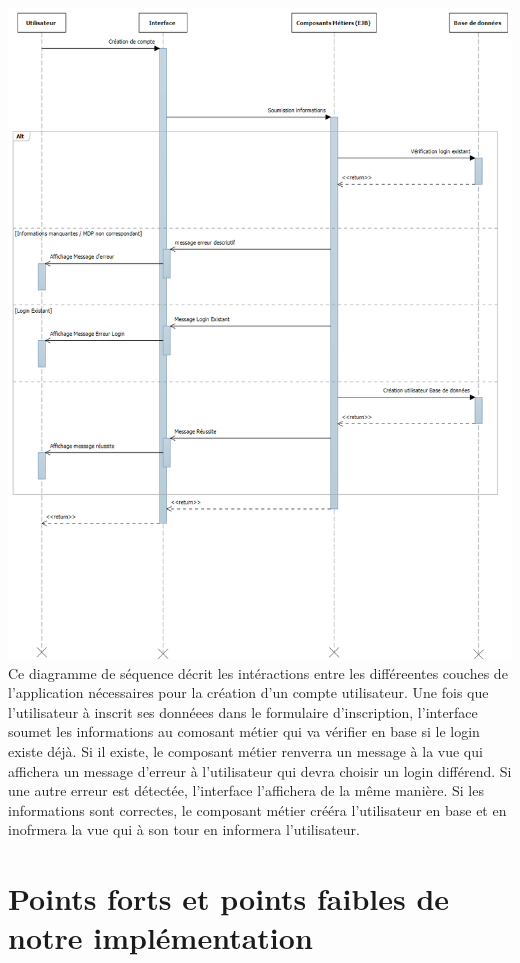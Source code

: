 \includegraphics[scale=0.37]{Res/accountCreationSequence.png}
Ce diagramme de séquence décrit les intéractions entre les différeentes couches de l'application nécessaires pour la création d'un compte utilisateur.
Une fois que l'utilisateur à inscrit ses donnéees dans le formulaire d'inscription, l'interface soumet les informations au comosant métier qui va vérifier en base si le login existe déjà.
Si il existe, le composant métier renverra un message à la vue qui affichera un message d'erreur à l'utilisateur qui devra choisir un login différend.
Si une autre erreur est détectée, l'interface l'affichera de la même manière.
Si les informations sont correctes, le composant métier crééra l'utilisateur en base et en inofrmera la vue qui à son tour en informera l'utilisateur.



\section{Points forts et points faibles de notre implémentation}

